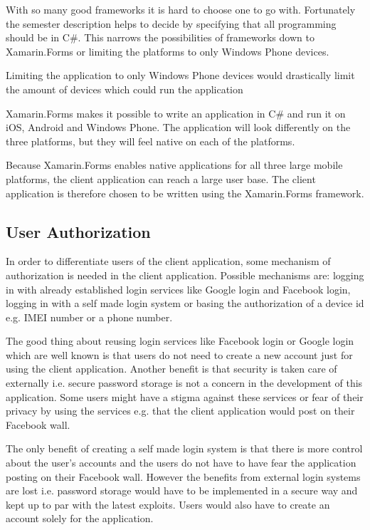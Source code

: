 With so many good frameworks it is hard to choose one to go with. Fortunately the semester description helps to decide by specifying that all programming should be in C\#. This narrows the possibilities of frameworks down to Xamarin.Forms or limiting the platforms to only Windows Phone devices.

Limiting the application to only Windows Phone devices would drastically limit the amount of devices which could run the application

Xamarin.Forms makes it possible to write an application in C\# and run it on iOS, Android and Windows Phone. The application will look differently on the three platforms, but they will feel native on each of the platforms.

Because Xamarin.Forms enables native applications for all three large mobile platforms, the client application can reach a large user base. The client application is therefore chosen to be written using the Xamarin.Forms framework.

\subsection{User Authorization}
\label{par:user_authorization}

In order to differentiate users of the client application, some mechanism of authorization is needed in the client application. Possible mechanisms are: logging in with already established login services like Google login and Facebook login, logging in with a self made login system or basing the authorization of a device id e.g. IMEI number or a phone number.

The good thing about reusing login services like Facebook login or Google login which are well known is that users do not need to create a new account just for using the client application. Another benefit is that security is taken care of externally i.e. secure password storage is not a concern in the development of this application. Some users might have a stigma against these services or fear of their privacy by using the services e.g. that the client application would post on their Facebook wall.

The only benefit of creating a self made login system is that there is more control about the user's accounts and the users do not have to have fear the application posting on their Facebook wall. However the benefits from external login systems are lost i.e. password storage would have to be implemented in a secure way and kept up to par with the latest exploits. Users would also have to create an account solely for the application.

